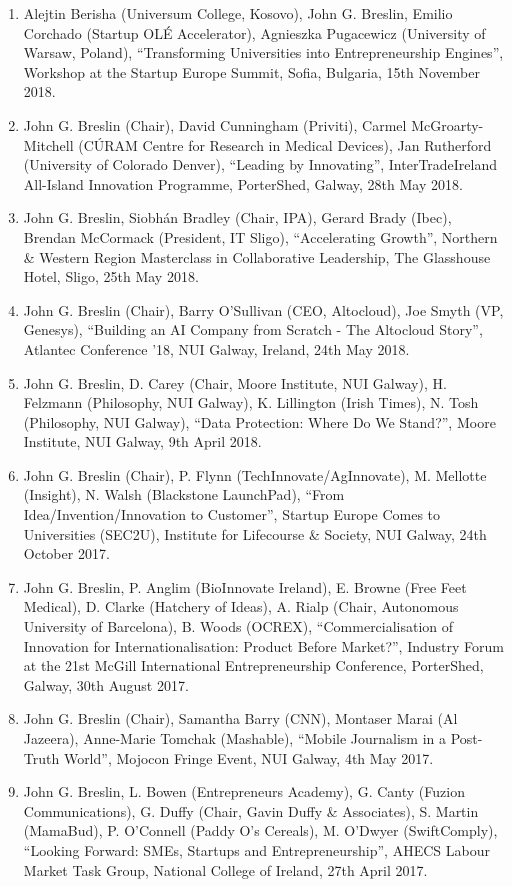 \documentclass[10pt,a4paper]{res} %
\begin{document}
\begin{resume}
\begin{enumerate}
\item Alejtin Berisha (Universum College, Kosovo), John G. Breslin, Emilio Corchado (Startup OL\'{E} Accelerator), Agnieszka Pugacewicz (University of Warsaw, Poland), ``Transforming Universities into Entrepreneurship Engines'', Workshop at the Startup Europe Summit, Sofia, Bulgaria, 15th November 2018.
\item John G. Breslin (Chair), David Cunningham (Priviti), Carmel McGroarty-Mitchell (C\'{U}RAM Centre for Research in Medical Devices), Jan Rutherford (University of Colorado Denver), ``Leading by Innovating'', InterTradeIreland All-Island Innovation Programme, PorterShed, Galway, 28th May 2018.
\item John G. Breslin, Siobh\'{a}n Bradley (Chair, IPA), Gerard Brady (Ibec), Brendan McCormack (President, IT Sligo), ``Accelerating Growth'', Northern \& Western Region Masterclass in Collaborative Leadership, The Glasshouse Hotel, Sligo, 25th May 2018.
\item John G. Breslin (Chair), Barry O'Sullivan (CEO, Altocloud), Joe Smyth (VP, Genesys), ``Building an AI Company from Scratch - The Altocloud Story'', Atlantec Conference '18, NUI Galway, Ireland, 24th May 2018.
\item John G. Breslin, D. Carey (Chair, Moore Institute, NUI Galway), H. Felzmann (Philosophy, NUI Galway), K. Lillington (Irish Times), N. Tosh (Philosophy, NUI Galway), ``Data Protection: Where Do We Stand?'', Moore Institute, NUI Galway, 9th April 2018.
\item John G. Breslin (Chair), P. Flynn (TechInnovate/AgInnovate), M. Mellotte (Insight), N. Walsh (Blackstone LaunchPad), ``From Idea/Invention/Innovation to Customer'', Startup Europe Comes to Universities (SEC2U), Institute for Lifecourse \& Society, NUI Galway, 24th October 2017.
\item John G. Breslin, P. Anglim (BioInnovate Ireland), E. Browne (Free Feet Medical), D. Clarke (Hatchery of Ideas), A. Rialp (Chair, Autonomous University of Barcelona), B. Woods (OCREX), ``Commercialisation of Innovation for Internationalisation: Product Before Market?'', Industry Forum at the 21st McGill International Entrepreneurship Conference, PorterShed, Galway, 30th August 2017.
\item John G. Breslin (Chair), Samantha Barry (CNN), Montaser Marai (Al Jazeera), Anne-Marie Tomchak (Mashable), ``Mobile Journalism in a Post-Truth World'', Mojocon Fringe Event, NUI Galway, 4th May 2017.
\item John G. Breslin, L. Bowen (Entrepreneurs Academy), G. Canty (Fuzion Communications), G. Duffy (Chair, Gavin Duffy \& Associates), S. Martin (MamaBud), P. O'Connell (Paddy O's Cereals), M. O'Dwyer (SwiftComply), ``Looking Forward: SMEs, Startups and Entrepreneurship'', AHECS Labour Market Task Group, National College of Ireland, 27th April 2017.

\end{enumerate}
\end{resume}
\end{document}
